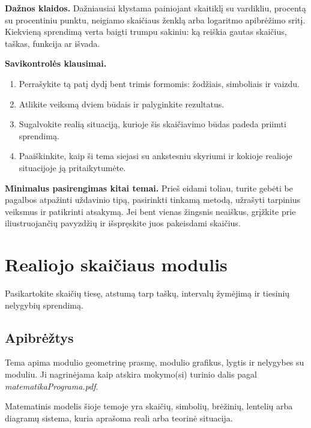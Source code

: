 \textbf{Dažnos klaidos.} Dažniausiai klystama painiojant skaitiklį su vardikliu, procentą su procentiniu punktu, neigiamo skaičiaus ženklą arba logaritmo apibrėžimo sritį. Kiekvieną sprendimą verta baigti trumpu sakiniu: ką reiškia gautas skaičius, taškas, funkcija ar išvada.

\textbf{Savikontrolės klausimai.}
\begin{enumerate}[label=\arabic*.]
\item Perrašykite tą patį dydį bent trimis formomis: žodžiais, simboliais ir vaizdu.
\item Atlikite veiksmą dviem būdais ir palyginkite rezultatus.
\item Sugalvokite realią situaciją, kurioje šis skaičiavimo būdas padeda priimti sprendimą.
\item Paaiškinkite, kaip ši tema siejasi su ankstesniu skyriumi ir kokioje realioje situacijoje ją pritaikytumėte.
\end{enumerate}

\textbf{Minimalus pasirengimas kitai temai.} Prieš eidami toliau, turite gebėti be pagalbos atpažinti uždavinio tipą, pasirinkti tinkamą metodą, užrašyti tarpinius veiksmus ir patikrinti atsakymą. Jei bent vienas žingsnis neaiškus, grįžkite prie iliustruojančių pavyzdžių ir išspręskite juos pakeisdami skaičius.

\section{Realiojo skaičiaus modulis}\label{sec:realiojo-skaiciaus-modulis}

\begin{tcolorbox}[title=Prieš pradedant, colback=green!5]
Pasikartokite skaičių tiesę, atstumą tarp taškų, intervalų žymėjimą ir tiesinių nelygybių sprendimą.
\end{tcolorbox}
\subsection{Apibrėžtys}
\begin{apibreztis}
Tema apima modulio geometrinę prasmę, modulio grafikus, lygtis ir nelygybes su moduliu. Ji nagrinėjama kaip atskira mokymo(si) turinio dalis pagal \emph{matematikaPrograma.pdf}.
\end{apibreztis}
\begin{apibreztis}
Matematinis modelis šioje temoje yra skaičių, simbolių, brėžinių, lentelių arba diagramų sistema, kuria aprašoma reali arba teorinė situacija.
\end{apibreztis}

